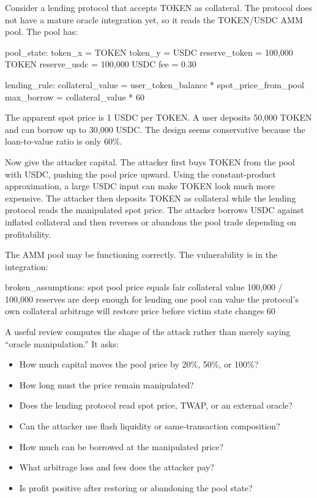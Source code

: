 Consider a lending protocol that accepts TOKEN as collateral. The protocol does not have a mature oracle integration yet, so it reads the TOKEN/USDC AMM pool. The pool has:

\begin{codeblock}
pool_state:
    token_x = TOKEN
    token_y = USDC
    reserve_token = 100,000 TOKEN
    reserve_usdc = 100,000 USDC
    fee = 0.30%

lending_rule:
    collateral_value = user_token_balance * spot_price_from_pool
    max_borrow = collateral_value * 60%
\end{codeblock}

The apparent spot price is 1 USDC per TOKEN. A user deposits 50,000 TOKEN and can borrow up to 30,000 USDC. The design seems conservative because the loan-to-value ratio is only 60\%.

Now give the attacker capital. The attacker first buys TOKEN from the pool with USDC, pushing the pool price upward. Using the constant-product approximation, a large USDC input can make TOKEN look much more expensive. The attacker then deposits TOKEN as collateral while the lending protocol reads the manipulated spot price. The attacker borrows USDC against inflated collateral and then reverses or abandons the pool trade depending on profitability.

The AMM pool may be functioning correctly. The vulnerability is in the integration:

\begin{codeblock}
broken_assumptions:
    spot pool price equals fair collateral value
    100,000 / 100,000 reserves are deep enough for lending
    one pool can value the protocol's own collateral
    arbitrage will restore price before victim state changes
    60%
\end{codeblock}

A useful review computes the shape of the attack rather than merely saying ``oracle manipulation.'' It asks:

\begin{itemize}
\item How much capital moves the pool price by 20\%, 50\%, or 100\%?
\item How long must the price remain manipulated?
\item Does the lending protocol read spot price, TWAP, or an external oracle?
\item Can the attacker use flash liquidity or same-transaction composition?
\item How much can be borrowed at the manipulated price?
\item What arbitrage loss and fees does the attacker pay?
\item Is profit positive after restoring or abandoning the pool state?
\end{itemize}

